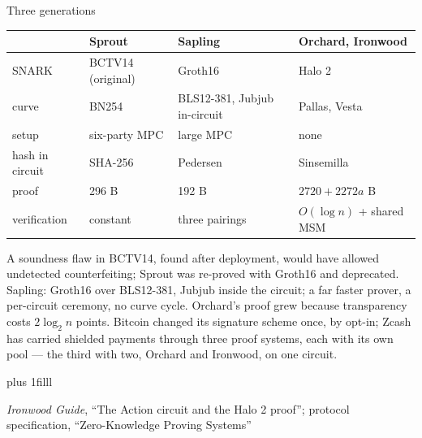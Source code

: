 \documentclass[aspectratio=169,11pt]{beamer}
\newcommand{\src}[1]{\par\vskip0pt plus 1filll
  {\fontsize{6}{7.2}\selectfont\color{arbdim}\raggedright #1\par}}
\begin{document}
\begin{frame}{Three generations}
{\centering\small
\setlength{\tabcolsep}{4pt}
\begin{tabular}{@{}llll@{}}
\toprule
& Sprout & Sapling & Orchard, Ironwood \\
\midrule
SNARK & BCTV14 (original) & Groth16 & Halo 2 \\
curve & BN254 & BLS12-381, Jubjub in-circuit & Pallas, Vesta \\
setup & six-party MPC & large MPC & none \\
hash in circuit & SHA-256 & Pedersen & Sinsemilla \\
proof & 296 B & 192 B & $2720 + 2272a$ B \\
verification & constant & three pairings & $O(\log n)$ + shared MSM \\
\bottomrule
\end{tabular}\par}
A soundness flaw in BCTV14, found after deployment, would have allowed
undetected counterfeiting; Sprout was re-proved with Groth16 and
deprecated. Sapling: Groth16 over BLS12-381, Jubjub inside the circuit;
a far faster prover, a per-circuit ceremony, no curve cycle. Orchard's
proof grew because transparency costs $2\log_2 n$ points.
Bitcoin changed its signature scheme once, by opt-in; Zcash has carried
shielded payments through three proof systems, each with its own pool
--- the third with two, Orchard and Ironwood, on one circuit.
\src{\emph{Ironwood Guide}, ``The Action circuit and the Halo 2 proof'';
  protocol specification, ``Zero-Knowledge Proving Systems''}
\end{frame}
\end{document}
